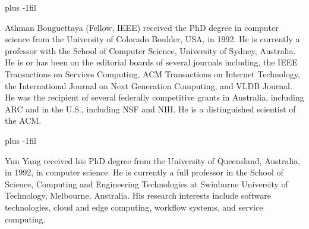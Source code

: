 \documentclass[10pt,journal,compsoc]{IEEEtran}
\begin{document}
\baselineskip plus -1fil
\begin{IEEEbiography}{Athman Bouguettaya} (Fellow, IEEE) received the PhD degree in computer science from the University of Colorado Boulder, USA, in 1992. He
is currently a professor with the School of Computer Science, University of Sydney, Australia. He is or has been on the editorial boards of several
journals including, the IEEE Transactions on Services Computing, ACM Transactions on Internet Technology, the International Journal on Next Generation Computing, and VLDB Journal. He was the recipient of several federally competitive grants in Australia, including ARC and in the U.S., including NSF and NIH. He is a distinguished scientist of the ACM.
\end{IEEEbiography}

\baselineskip plus -1fil
\begin{IEEEbiography}{Yun Yang} received his PhD degree from the University of Queensland, Australia, in 1992, in computer science. He is currently a full professor in the School of Science, Computing and Engineering Technologies at Swinburne University of Technology, Melbourne, Australia. His research interests include software technologies, cloud and edge computing, workflow systems, and service computing.
\end{IEEEbiography}


\clearpage
\end{document}
